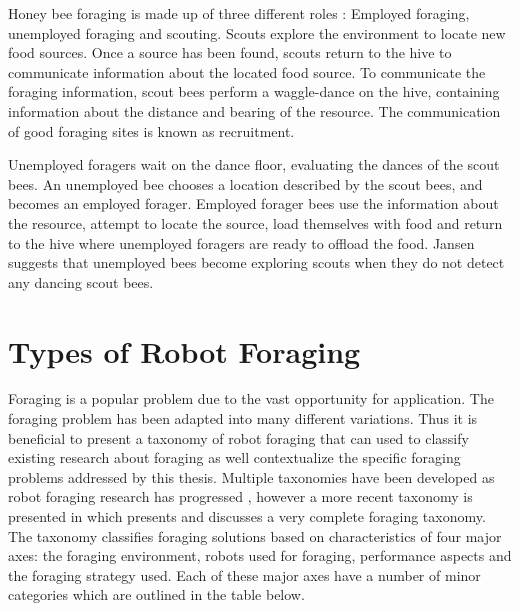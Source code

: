 Honey bee foraging is made up of three different roles \cite{seeley2009wisdom}: Employed foraging, unemployed foraging and scouting. Scouts explore the environment to locate new food sources. Once a source has been found, scouts return to the hive to communicate information about the located food source. To communicate the foraging information, scout bees perform a waggle-dance on the hive, containing information about the distance and bearing of the resource. The communication of good foraging sites is known as recruitment. 

Unemployed foragers wait on the dance floor, evaluating the dances of the scout bees. An  unemployed bee chooses a location described by the scout bees, and becomes an employed forager. Employed forager bees use the information about the resource, attempt to locate the source, load themselves with food and return to the hive where unemployed foragers are ready to offload the food. Jansen \cite{janson2007searching} suggests that unemployed bees become exploring scouts when they do not detect any dancing scout bees. 


\section{Types of Robot Foraging}
\label{sec:second:types}

Foraging is a popular problem due to the vast opportunity for application. The foraging problem has been adapted into many different variations. Thus it is beneficial to present a taxonomy of robot foraging that can used to classify existing research about foraging as well contextualize the specific foraging problems addressed by this thesis. Multiple taxonomies have been developed as robot foraging research has progressed \cite{oster1978caste,ostergaard2001emergent}, however a more recent taxonomy is presented in \cite{winfield2009foraging} which presents and discusses a very complete foraging taxonomy. The taxonomy classifies foraging solutions based on characteristics of four major axes: the foraging environment, robots used for foraging, performance aspects and the foraging strategy used. Each of these major axes have a number of minor categories which are outlined in the table below.  

